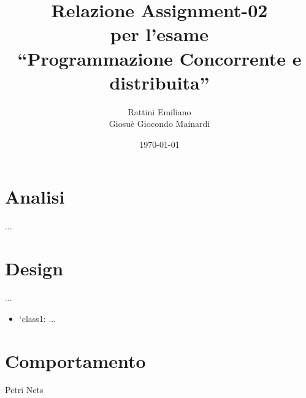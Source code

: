 \documentclass[a4paper,12pt]{report}
\title{Relazione Assignment-02 \\ per l'esame \\ ``Programmazione Concorrente e distribuita''}
\author{Rattini Emiliano\\Giosuè Giocondo Mainardi}
\date{\today}
\begin{document}
\maketitle

\tableofcontents

\chapter{Analisi}
...

\chapter{Design}
...
\begin{itemize}
    \item `class1: ...
\end{itemize}

\chapter{Comportamento}
Petri Nets
\end{document}
